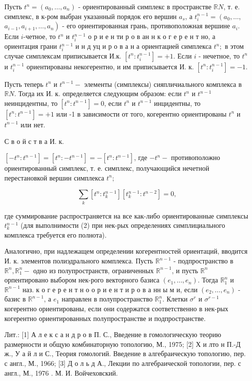 \documentclass[10pt]{article}
\begin{document}
Пусть $t^{n}=\left(a_{0}, \ldots, a_{n}\right)$ - ориентированный симплекс в пространстве $\mathbb{R} N$, т. е. симплекс, в к-ром выбран указанный порядок его вершин $a_{s}$, а $t_{i}^{n-1}=\left(a_{0}, \ldots\right.$, $\left.a_{i-1}, a_{i+1}, \ldots, a_{n}\right)$ - его ориентированная грань, противоположная вершине $a_{i}$. Если $i$-четное, то $t^{n}$ и $t_{i}^{n-1}$ о р и е н ти р о в ан н к о г е р е н т но, а ориентация грани $t_{i}^{n-1}$ и н д уц и р о в а н а ориентацией симплекса $t^{n} ;$ в этом случае симплексам приписывается И.к. $\left[t^{n}: t_{i}^{n-1}\right]=+1$. Если $i$ - нечетное, то $t^{n}$ и $t_{i}^{n-1}$ ориентированы некогерентно, и им приписывается И. к. $\left[t^{n}: t_{i}^{n-1}\right]=-1$.



Пусть теперь $t^{n}$ и $t^{n-1}-$ элементы (симплексы) сияпличиального комплекса в $\mathbb{R} N$. Тогда их И. к. определяется следующим образом: если $t^{n}$ и $t^{n-1}$ неинцидентны, то $\left[t^{n}: t^{n-1}\right]=0$, если $t^{n}$ и $t^{n-1}$ инцидентны, то $\left[t^{n}: t^{n-1}\right]=+1$ или -1 в зависимости от того, когерентно ориентированы $t^{n}$ и $t^{n-1}$ или нет.



С в о й с т в а И. к.



$\left[-t^{n}: t^{n-1}\right]=\left[t^{n}:-t^{n-1}\right]=-\left[t^{n}: t^{n-1}\right]$, где $-t^{n}-$ противоположно ориентированный симплекс, т. е. симплекс, получающийся нечетной перестановкой вершин симплекса $t^{n}$;



\[

\sum_{k}\left[t^{n}: t_{k}^{n-1}\right]\left[t_{k}^{n-1}: t^{n-2}\right]=0,

\]



где суммирование распространяется на все как-либо ориентированные симплексы $t_{k}^{n-1}$ (для выполнимости (2) при нек-рых определениях симплициального комплекса требуется его полнота).



Аналогично, при надлежащем определении когерентностей ориентаций, вводится И. к. элементов полиэдрального комплекса. Пусть $\mathbb{R}^{n-1}$ - подпространство в $\mathbb{R}^{n}, \mathbb{R}_{1}^{n}-$ одно из полупространств, ограниченных $\mathbb{R}^{n-1}$, и пусть $\mathbb{R}^{n}$ орпентировано выбором нек-рого векторного базиса $\left(e_{1}, \ldots, e_{n}\right)$. Тогда $\mathbb{R}_{1}^{n}$ и $\mathbb{R}^{n-1}$ наз. к о г е р е н т н о о р и е н т и р о в а нн ы м и, если $\left(e_{2}, \ldots, e_{n}\right)$ - базис в $\mathbb{R}^{n-1}$, а $e_{1}$ направлен в полупространство $\mathbb{R}_{1}^{n}$. Клетки $\sigma^{r}$ и $\sigma^{r-1}$ когерентно ориентированы, если они содержатся соответственно в нек-рых когерентно ориентированных полупространстве и подпространстве.



Лит.: [1] А л е к с а н д р о в П. С., Введение в гомологическую теорию размерности и общую комбинаторную топологию, М., 1975; [2] Х и лто н П.-Д ж., У а й л и С., Теория гомологий. Введение в алгебраическую топологию, пер. с англ., М., 1966; [3] Д о л ь д А., Лекции по алгебраической топологии, пер. с англ., М., 1976 . М. И. Войчеховский.
\end{document}
